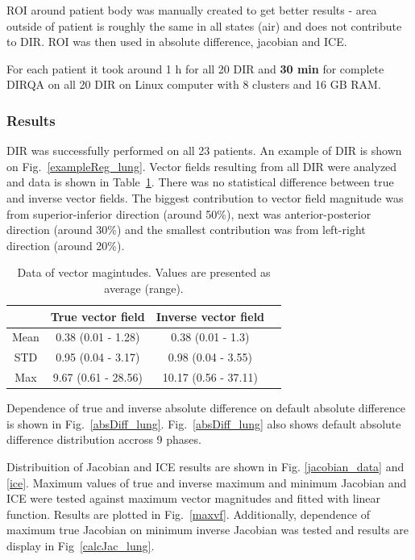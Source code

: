 \documentclass[type=dr, dr=rernat, accentcolor=tud7b,colorbacktitle, bigchapter, openright, twoside, 12pt ]{tudthesis}
\begin{document}
ROI around patient body was manually created to get better results - area outside of patient is roughly the same in all states (air) and does not contribute to DIR. ROI was then used in absolute difference, jacobian and ICE.

For each patient it took around 1 h for all 20 DIR and \textbf{30 min} for complete DIRQA on all 20 DIR  on Linux computer with 8 clusters and 16 GB RAM.


\subsubsection{Results}

DIR was successfully performed on all 23 patients. An example of DIR is shown on Fig.~\ref{exampleReg_lung}. Vector fields resulting from all DIR were analyzed and data is shown in Table~\ref{tab:vectordata_lung}. There was no statistical
difference between true and inverse vector fields. The biggest contribution to vector field magnitude was from superior-inferior direction (around 50\%), next was anterior-posterior direction (around 30\%) and the smallest contribution was from left-right direction (around 20\%).

\begin{table}[H]
  \centering
  \caption{Data of vector magintudes. Values are presented as average (range).}
  \begin{tabular}{c|c|c|c}
  
       & True vector field & Inverse vector field  \\
       \hline
       Mean & 0.38 (0.01 - 1.28) & 0.38 (0.01 - 1.3) \\ 
       STD & 0.95 (0.04 - 3.17) & 0.98 (0.04 - 3.55) \\ 
       Max & 9.67 (0.61 - 28.56) & 10.17 (0.56 - 37.11) \\
    \hline\hline
  \end{tabular}
  \label{tab:vectordata_lung}
\end{table}

Dependence of true and inverse absolute difference on default absolute difference is shown in Fig.~\ref{absDiff_lung}. Fig.~\ref{absDiff_lung} also shows default absolute difference distribution accross 9 phases. 

Distribuition of Jacobian and ICE results are shown in Fig. \ref{jacobian_data} and \ref{ice}. Maximum values of true and inverse maximum and minimum Jacobian and ICE were tested against maximum vector magnitudes and fitted with linear function. Results are plotted in Fig.~\ref{maxvf}.
Additionally, dependence of maximum true Jacobian on minimum inverse Jacobian was tested and results are display in Fig~\ref{calcJac_lung}.
\end{document}
